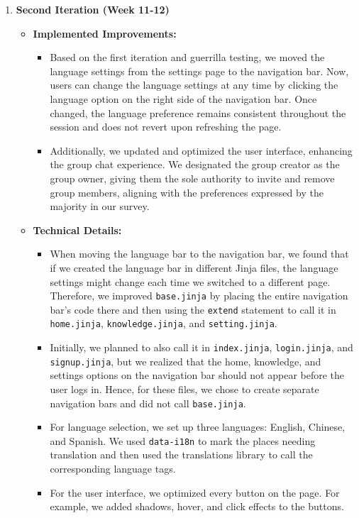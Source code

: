 \documentclass[12pt]{article}
\begin{document}
\begin{enumerate}
    \item \textbf{Second Iteration (Week 11-12)}
        \begin{itemize}
            \item \textbf{Implemented Improvements:}
            \begin{itemize}
                \item Based on the first iteration and guerrilla testing, we moved the language settings from the settings page to the navigation bar. Now, users can change the language settings at any time by clicking the language option on the right side of the navigation bar. Once changed, the language preference remains consistent throughout the session and does not revert upon refreshing the page.
                \item Additionally, we updated and optimized the user interface, enhancing the group chat experience. We designated the group creator as the group owner, giving them the sole authority to invite and remove group members, aligning with the preferences expressed by the majority in our survey.
            \end{itemize}
            \item \textbf{Technical Details:}
            \begin{itemize}
                \item When moving the language bar to the navigation bar, we found that if we created the language bar in different Jinja files, the language settings might change each time we switched to a different page. Therefore, we improved \texttt{base.jinja} by placing the entire navigation bar's code there and then using the \texttt{extend} statement to call it in \texttt{home.jinja}, \texttt{knowledge.jinja}, and \texttt{setting.jinja}.
                \item Initially, we planned to also call it in \texttt{index.jinja}, \texttt{login.jinja}, and \texttt{signup.jinja}, but we realized that the home, knowledge, and settings options on the navigation bar should not appear before the user logs in. Hence, for these files, we chose to create separate navigation bars and did not call \texttt{base.jinja}.
                \item For language selection, we set up three languages: English, Chinese, and Spanish. We used \texttt{data-i18n} to mark the places needing translation and then used the translations library to call the corresponding language tags.
                \item For the user interface, we optimized every button on the page. For example, we added shadows, hover, and click effects to the buttons.

\end{itemize}
\end{itemize}
\end{enumerate}
\end{document}
